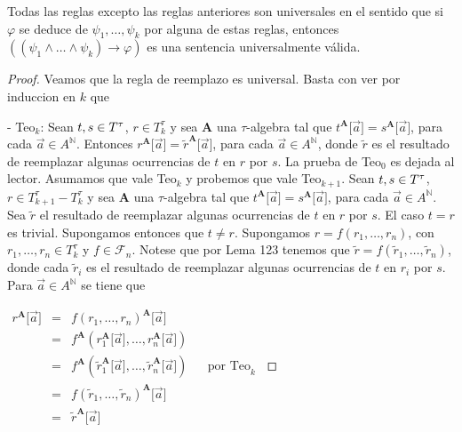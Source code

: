  \begin{lemma}
    \PN Todas las reglas excepto las reglas anteriores son universales en el sentido que si $\varphi$ se deduce de
    $\psi_{1}, \dotsc, \psi_{k}$ por alguna de estas reglas, entonces $\left((\psi_{1} \wedge \dotsc \wedge \psi_{k})
    \rightarrow \varphi \right)$ es una sentencia universalmente válida.
  \end{lemma}
  \begin{proof}
    Veamos que la regla de reemplazo es universal. Basta con ver por induccion en $k$ que

    - Teo$_{k}$: Sean $t,s\in T^{\tau}$, $r\in T_{k}^{\tau }$ y sea $ \mathbf{A}$ una $\tau $-algebra tal que $t^{\mathbf{A}}\lbrack\vec{a}\rbrack=s^{\mathbf{A }}\lbrack\vec{a}\rbrack$, para cada $\vec{a}\in A^{\mathbb{N}}$. Entonces $r^{\mathbf{A} }\lbrack\vec{a}\rbrack=\tilde{r}^{\mathbf{A}}\lbrack\vec{a}\rbrack$, para cada $\vec{a}\in A^{ \mathbb{N}}$, donde $\tilde{r}$ es el resultado de reemplazar algunas ocurrencias de $t$ en $r$ por $s.$
    La prueba de Teo$_{0}$ es dejada al lector. Asumamos que vale Teo$_{k}$ y probemos que vale Teo$_{k+1}$. Sean $t,s\in T^{\tau}$, $r\in T_{k+1}^{\tau }-T_{k}^{\tau }$ y sea $\mathbf{A}$ una $\tau $-algebra tal que $t^{\mathbf{A }}\lbrack\vec{a}\rbrack=s^{\mathbf{A}}\lbrack\vec{a}\rbrack$, para cada $\vec{a}\in A^{\mathbb{N}}$. Sea $\tilde{r}$ el resultado de reemplazar algunas ocurrencias de $t$ en $r$ por $s$. El caso $t=r$ es trivial. Supongamos entonces que $t\neq r$. Supongamos $r=f(r_{1}, \dotsc, r_{n})$, con $r_{1}, \dotsc, r_{n}\in T_{k}^{\tau }$ y $ f\in \mathcal{F}_{n}$. Notese que por Lema 123 tenemos que $\tilde{r}=f(\tilde{r}_{1}, \dotsc, \tilde{r}_{n})$, donde cada $\tilde{r} _{i} $ es el resultado de reemplazar algunas ocurrencias de $t$ en $r_{i}$ por $s$. Para $\vec{a}\in A^{\mathbb{N}}$ se tiene que

    $\displaystyle \begin{array}{cclll} r^{\mathbf{A}}\lbrack\vec{a}\rbrack & = & f(r_{1}, \dotsc, r_{n})^{\mathbf{A}}\lbrack\vec{a}\rbrack & & \\ & = & f^{\mathbf{A}}(r_{1}^{\mathbf{A}}\lbrack\vec{a}\rbrack, \dotsc, r_{n}^{\mathbf{A}}\lbrack\vec{ a}\rbrack) & & \\ & = & f^{\mathbf{A}}(\tilde{r}_{1}^{\mathbf{A}}\lbrack\vec{a}\rbrack, \dotsc, \tilde{r}_{n}^{ \mathbf{A}}\lbrack\vec{a}\rbrack) & & \text{por Teo}_{k} \\ & = & f(\tilde{r}_{1}, \dotsc, \tilde{r}_{n})^{\mathbf{A}}\lbrack\vec{a}\rbrack & & \\ & = & \tilde{r}^{\mathbf{A}}\lbrack\vec{a}\rbrack & & \end{array} $


\end{proof}
